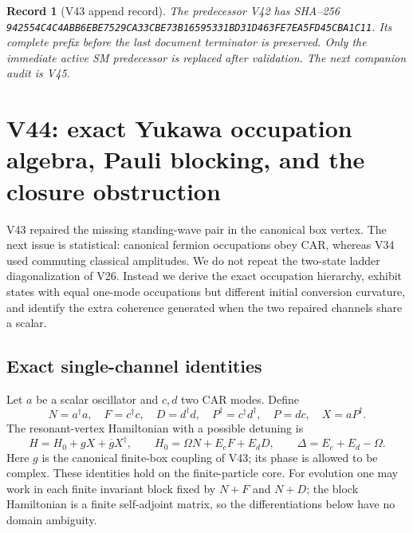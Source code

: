 \documentclass[11pt]{article}
\newtheorem{record}[theorem]{Record}
\theoremstyle{remark}
\begin{document}
\begin{record}[V43 append record]
\label{rec:v20v43}
The predecessor V42 has SHA--256
\texttt{942554C4C4ABB6EBE7529CA33CBE73B16595331BD31D463FE7EA5FD45CBA1C11}.
Its complete prefix before the last document terminator is preserved.
Only the immediate active SM predecessor is replaced after validation.
The next companion audit is V45.
\end{record}



\section{V44: exact Yukawa occupation algebra, Pauli blocking, and the closure obstruction}
\label{sec:v20v44}

V43 repaired the missing standing-wave pair in the canonical box vertex.
The next issue is statistical: canonical fermion occupations obey CAR,
whereas V34 used commuting classical amplitudes.  We do not repeat the
two-state ladder diagonalization of V26.  Instead we derive the exact
occupation hierarchy, exhibit states with equal one-mode occupations
but different initial conversion curvature, and identify the extra
coherence generated when the two repaired channels share a scalar.

\subsection{Exact single-channel identities}

Let \(a\) be a scalar oscillator and \(c,d\) two CAR modes.  Define
\[
 N=a^\dagger a,\quad F=c^\dagger c,\quad D=d^\dagger d,\quad
 P^\dagger=c^\dagger d^\dagger,\quad P=dc,\quad X=aP^\dagger.
\]
The resonant-vertex Hamiltonian with a possible detuning is
\[
 H=H_0+gX+\overline gX^\dagger,\qquad
 H_0=\Omega N+E_cF+E_dD,\qquad
 \Delta=E_c+E_d-\Omega.
\]
Here \(g\) is the canonical finite-box coupling of V43; its phase is
allowed to be complex.  These identities hold on the finite-particle
core.  For evolution one may work in each finite invariant block fixed
by \(N+F\) and \(N+D\); the block Hamiltonian is a finite self-adjoint
matrix, so the differentiations below have no domain ambiguity.
\end{document}
